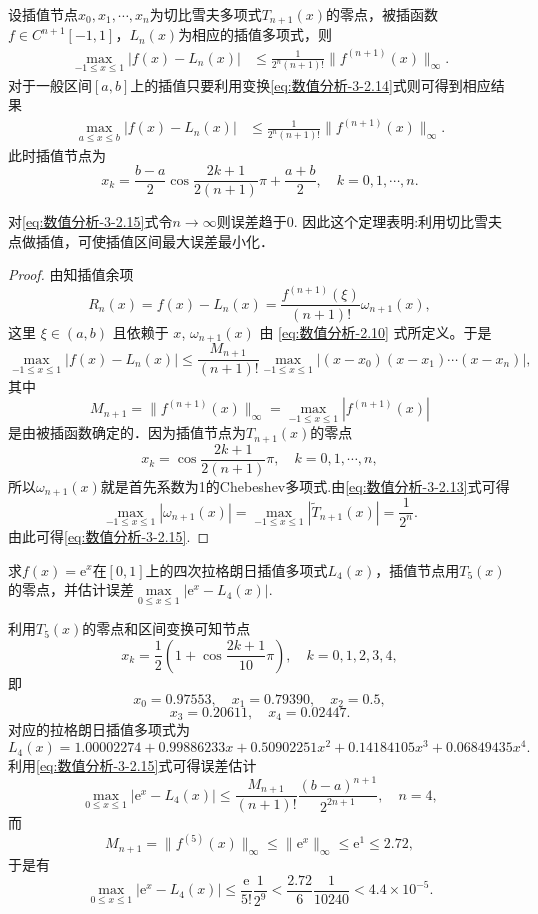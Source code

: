 \documentclass[../../main.tex]{subfiles}
\begin{document}
\begin{theorem}
设插值节点$x_0,x_1,\cdots,x_n$为切比雪夫多项式$T_{n+1}(x)$的零点，被插函数$f \in C^{n+1}[-1,1]$，$L_n(x)$为相应的插值多项式，则
\begin{align}\label{eq:数值分析-3-2.15}
\max_{-1 \leq x \leq 1} |f(x) - L_n(x)| &\leq \frac{1}{2^n (n+1)!}\|f^{(n+1)}(x)\|_\infty.
\end{align}
对于一般区间$[a,b]$上的插值只要利用变换\eqref{eq:数值分析-3-2.14}式则可得到相应结果
\begin{align*}
\max_{a \leq x \leq b} |f(x) - L_n(x)| &\leq \frac{1}{2^n (n+1)!}\|f^{(n+1)}(x)\|_\infty.
\end{align*}
此时插值节点为
$$x_k = \frac{b - a}{2}\cos\frac{2k+1}{2(n+1)}\pi + \frac{a + b}{2},\quad k = 0,1,\cdots,n.$$
\end{theorem}
\begin{note}
对\eqref{eq:数值分析-3-2.15}式令$n\to \infty$则误差趋于0. 因此这个定理表明:利用切比雪夫点做插值，可使插值区间最大误差最小化．
\end{note}
\begin{proof}
由知插值余项
$$R_n(x) = f(x) - L_n(x) = \frac{f^{(n+1)}(\xi)}{(n+1)!}\omega_{n+1}(x),$$
这里 $\xi \in (a, b)$ 且依赖于 $x$,$\,\,\omega_{n + 1}(x)$ 由 \eqref{eq:数值分析-2.10} 式所定义。于是
$$\max_{-1 \leq x \leq 1} |f(x) - L_n(x)| \leq \frac{M_{n+1}}{(n+1)!}\max_{-1 \leq x \leq 1} |(x - x_0)(x - x_1)\cdots(x - x_n)|,$$
其中
$$M_{n+1} = \|f^{(n+1)}(x)\|_\infty = \max_{-1 \leq x \leq 1} |f^{(n+1)}(x)|$$
是由被插函数确定的．因为插值节点为$T_{n+1}(x)$的零点
$$x_k = \cos\frac{2k+1}{2(n+1)}\pi,\quad k = 0,1,\cdots,n,$$
所以$\omega_{n+1}(x)$就是首先系数为1的Chebeshev多项式.由\eqref{eq:数值分析-3-2.13}式可得
$$\max_{-1 \leq x \leq 1} |\omega_{n+1}(x)| = \max_{-1 \leq x \leq 1} |\widetilde{T}_{n+1}(x)| = \frac{1}{2^n}.$$
由此可得\eqref{eq:数值分析-3-2.15}.

\end{proof}

\begin{example}
求$f(x) = \mathrm{e}^x$在$[0,1]$上的四次拉格朗日插值多项式$L_4(x)$，插值节点用$T_5(x)$的零点，并估计误差$\max\limits_{0 \leq x \leq 1} |\mathrm{e}^x - L_4(x)|$.
\end{example}
\begin{solution}
利用$T_5(x)$的零点和区间变换可知节点
$$x_k = \frac{1}{2}\left(1 + \cos\frac{2k+1}{10}\pi\right),\quad k = 0,1,2,3,4,$$
即
$$x_0 = 0.97553,\quad x_1 = 0.79390,\quad x_2 = 0.5,$$
$$x_3 = 0.20611,\quad x_4 = 0.02447.$$
对应的拉格朗日插值多项式为
$$L_4(x) = 1.00002274 + 0.99886233x + 0.50902251x^2 + 0.14184105x^3 + 0.06849435x^4.$$
利用\eqref{eq:数值分析-3-2.15}式可得误差估计
$$\max\limits_{0 \leq x \leq 1} |\mathrm{e}^x - L_4(x)| \leq \frac{M_{n+1}}{(n+1)!} \frac{(b - a)^{n+1}}{2^{2n+1}},\quad n = 4,$$
而
$$M_{n+1} = \|f^{(5)}(x)\|_\infty \leq \|\mathrm{e}^x\|_\infty \leq \mathrm{e}^1 \leq 2.72,$$
于是有
$$\max\limits_{0 \leq x \leq 1} |\mathrm{e}^x - L_4(x)| \leq \frac{\mathrm{e}}{5!} \frac{1}{2^9} < \frac{2.72}{6} \frac{1}{10240} < 4.4 \times 10^{-5}.$$

\end{solution}
\end{document}

